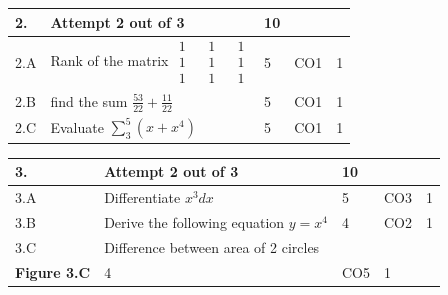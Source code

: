 \documentclass[12pt]{article}
\begin{document}
	\begin{longtable}{|L{1cm}|L{8cm}|C{1cm}|C{1cm}|C{1cm}|}\hline
	\bf2. & \bf{Attempt} \bf{2} \bf{out of} \bf{3} & \bf{10}  & & \\ \hline





		2.A &
	Rank of the matrix  $\begin{matrix} 1 && 1 &&1 \\ 1 && 1 && 1\\ 1 && 1 && 1 \end{matrix}$ \newline
			
	 &  5 & CO1 & 1\\ \hline
		2.B &
	find the sum $\frac{53}{22}+\frac{11}{22}$ \newline
			
	 &  5 & CO1 & 1\\ \hline
		2.C &
	Evaluate $\displaystyle \sum_{3}^{5}(x+x^{4})$ \newline
			
	 &  5 & CO1 & 1\\ \hline
	\end{longtable}


\begin{longtable}{|L{1cm}|L{8cm}|C{1cm}|C{1cm}|C{1cm}|}\hline
	\bf3. & \bf{Attempt} \bf{2} \bf{out of} \bf{3} & \bf{10}  & & \\ \hline





		3.A &
	Differentiate $x^{3}dx$ \newline
			
	 &  5 & CO3 & 1\\ \hline
		3.B &
	Derive the following equation $y=x^{4}$ \newline
			
	 &  4 & CO2 & 1\\ \hline
		3.C &
	Difference between area of 2 circles \newline
			\begin{center}
		\includegraphics[width=4cm,height=3cm]{media/diagrams/diagram.png}\\\bf{Figure }\bf3.C		
	\end{center}
		
	 &  4 & CO5 & 1\\ \hline
	\end{longtable}
\end{document}
